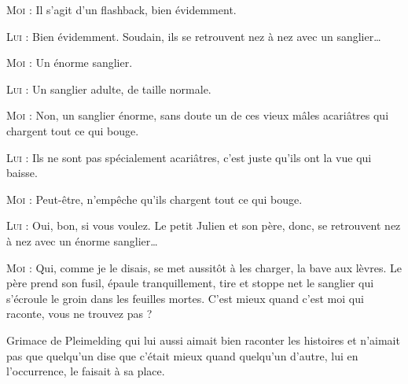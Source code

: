 \begin{dialogue}
\textsc{Moi} : Il s’agit d’un flashback, bien évidemment.

\textsc{Lui} : Bien évidemment. Soudain, ils se retrouvent nez à nez avec un sanglier…

\textsc{Moi} : Un énorme sanglier.

\textsc{Lui} : Un sanglier adulte, de taille normale.

\textsc{Moi} : Non, un sanglier énorme, sans doute un de ces vieux mâles acariâtres qui chargent tout ce qui bouge.

\textsc{Lui} : Ils ne sont pas spécialement acariâtres, c’est juste qu’ils ont la vue qui baisse.

\textsc{Moi} : Peut-être, n’empêche qu’ils chargent tout ce qui bouge.

\textsc{Lui} : Oui, bon, si vous voulez. Le petit Julien et son père, donc, se retrouvent nez à nez avec un énorme sanglier…

\textsc{Moi} : Qui, comme je le disais, se met aussitôt à les charger, la bave aux lèvres. Le père prend son fusil, épaule tranquillement, tire et stoppe net le sanglier qui s’écroule le groin dans les feuilles mortes. C’est mieux quand c’est moi qui raconte, vous ne trouvez pas ?

\end{dialogue}

Grimace de Pleimelding qui lui aussi aimait bien raconter les histoires et n’aimait pas que quelqu’un dise que c’était mieux quand quelqu’un d’autre, lui en l’occurrence, le faisait à sa place.


